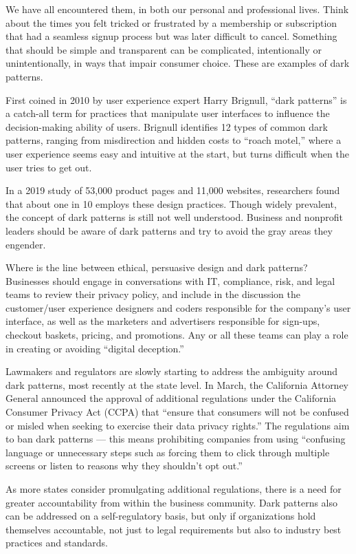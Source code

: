 We have all encountered them, in both our personal and professional lives. Think about the times you felt tricked or frustrated by a membership or subscription that had a seamless signup process but was later difficult to cancel. Something that should be simple and transparent can be complicated, intentionally or unintentionally, in ways that impair consumer choice. These are examples of dark patterns.


First coined in 2010 by user experience expert Harry Brignull, ``dark patterns'' is a catch-all term for practices that manipulate user interfaces to influence the decision-making ability of users. Brignull identifies 12 types of common dark patterns, ranging from misdirection and hidden costs to ``roach motel,'' where a user experience seems easy and intuitive at the start, but turns difficult when the user tries to get out.


In a 2019 study of 53,000 product pages and 11,000 websites, researchers found that about one in 10 employs these design practices. Though widely prevalent, the concept of dark patterns is still not well understood. Business and nonprofit leaders should be aware of dark patterns and try to avoid the gray areas they engender.


Where is the line between ethical, persuasive design and dark patterns? Businesses should engage in conversations with IT, compliance, risk, and legal teams to review their privacy policy, and include in the discussion the customer/user experience designers and coders responsible for the company's user interface, as well as the marketers and advertisers responsible for sign-ups, checkout baskets, pricing, and promotions. Any or all these teams can play a role in creating or avoiding ``digital deception.''


Lawmakers and regulators are slowly starting to address the ambiguity around dark patterns, most recently at the state level. In March, the California Attorney General announced the approval of additional regulations under the California Consumer Privacy Act (CCPA) that ``ensure that consumers will not be confused or misled when seeking to exercise their data privacy rights.'' The regulations aim to ban dark patterns — this means prohibiting companies from using ``confusing language or unnecessary steps such as forcing them to click through multiple screens or listen to reasons why they shouldn't opt out.''


As more states consider promulgating additional regulations, there is a need for greater accountability from within the business community. Dark patterns also can be addressed on a self-regulatory basis, but only if organizations hold themselves accountable, not just to legal requirements but also to industry best practices and standards. 